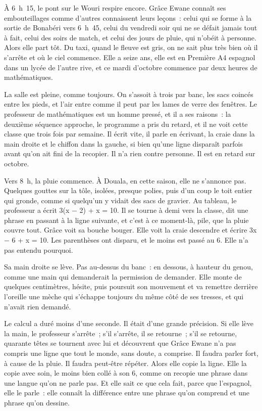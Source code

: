 \documentclass[10.5pt,twoside,openright]{book}
\newcommand{\chapitre}[2]{\cleardoublepage\markright{#2}\thispagestyle{plain}\vspace*{2.2cm}{\noindent\color{accent}\fontsize{54}{54}\selectfont\bfseries #1}\par\vspace{0.5em}{\noindent\LARGE\bfseries #2\par}\vspace{1.6em}\noindent\ignorespaces}
\begin{document}
\chapitre{3}{La main}

À 6 h 15, le pont sur le Wouri respire encore. Grâce Ewane connaît ses embouteillages comme d’autres connaissent leurs leçons : celui qui se forme à la sortie de Bonabéri vers 6 h 45, celui du vendredi soir qui ne se défait jamais tout à fait, celui des soirs de match, et celui des jours de pluie, qui n’obéit à personne. Alors elle part tôt. Du taxi, quand le fleuve est gris, on ne sait plus très bien où il s’arrête et où le ciel commence. Elle a seize ans, elle est en Première A4 espagnol dans un lycée de l’autre rive, et ce mardi d’octobre commence par deux heures de mathématiques.

La salle est pleine, comme toujours. On s’assoit à trois par banc, les sacs coincés entre les pieds, et l’air entre comme il peut par les lames de verre des fenêtres. Le professeur de mathématiques est un homme pressé, et il a ses raisons : la deuxième séquence approche, le programme a pris du retard, et il ne voit cette classe que trois fois par semaine. Il écrit vite, il parle en écrivant, la craie dans la main droite et le chiffon dans la gauche, si bien qu’une ligne disparaît parfois avant qu’on ait fini de la recopier. Il n’a rien contre personne. Il est en retard sur octobre.

Vers 8 h, la pluie commence. À Douala, en cette saison, elle ne s’annonce pas. Quelques gouttes sur la tôle, isolées, presque polies, puis d’un coup le toit entier qui gronde, comme si quelqu’un y vidait des sacs de gravier. Au tableau, le professeur a écrit 3(x − 2) + x = 10. Il se tourne à demi vers la classe, dit une phrase en passant à la ligne suivante, et c’est à ce moment-là, pile, que la pluie couvre tout. Grâce voit sa bouche bouger. Elle voit la craie descendre et écrire 3x − 6 + x = 10. Les parenthèses ont disparu, et le moins est passé au 6. Elle n’a pas entendu pourquoi.

Sa main droite se lève. Pas au-dessus du banc : en dessous, à hauteur du genou, comme une main qui demanderait la permission de demander. Elle monte de quelques centimètres, hésite, puis poursuit son mouvement et va remettre derrière l’oreille une mèche qui s’échappe toujours du même côté de ses tresses, et qui n’avait rien demandé.

Le calcul a duré moins d’une seconde. Il était d’une grande précision. Si elle lève la main, le professeur s’arrête ; s’il s’arrête, il se retourne ; s’il se retourne, quarante têtes se tournent avec lui et découvrent que Grâce Ewane n’a pas compris une ligne que tout le monde, sans doute, a comprise. Il faudra parler fort, à cause de la pluie. Il faudra peut-être répéter. Alors elle copie la ligne. Elle la copie avec soin, le moins bien collé à son 6, comme on recopie une phrase dans une langue qu’on ne parle pas. Et elle sait ce que cela fait, parce que l’espagnol, elle le parle : elle connaît la différence entre une phrase qu’on comprend et une phrase qu’on dessine.
\end{document}
